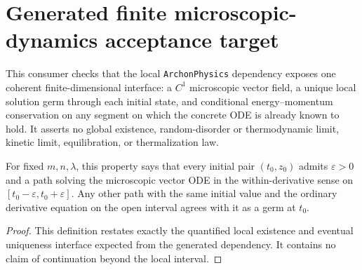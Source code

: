 
\chapter{Generated finite microscopic-dynamics acceptance target}
\label{ch:ArchonPhysics_Generated_problem_microscopic_dynamics}

This consumer checks that the local \texttt{ArchonPhysics} dependency exposes
one coherent finite-dimensional interface: a $C^1$ microscopic vector field,
a unique local solution germ through each initial state, and conditional
energy--momentum conservation on any segment on which the concrete ODE is
already known to hold.  It asserts no global existence, random-disorder or
thermodynamic limit, kinetic limit, equilibration, or thermalization law.

\begin{definition}
\label{def:microscopic-consumer:unique-local-solution-germ}
For fixed $m,n,\lambda$, this property says that every initial pair $(t_0,z_0)$
admits $\varepsilon>0$ and a path solving the microscopic vector ODE in the
within-derivative sense on
$[t_0-\varepsilon,t_0+\varepsilon]$.  Any other path with the same initial
value and the ordinary derivative equation on the open interval agrees with
it as a germ at $t_0$.
\end{definition}
\begin{proof}

\leanok
This definition restates exactly the quantified local existence and eventual
uniqueness interface expected from the generated dependency.  It contains no
claim of continuation beyond the local interval.
\end{proof}


